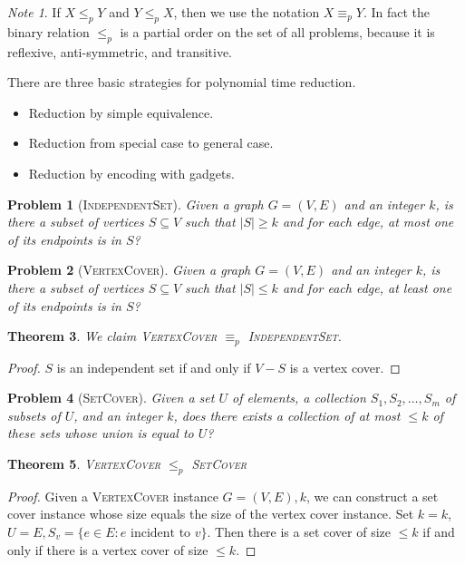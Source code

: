 \documentclass[10pt, oneside, reqno]{amsart}
\theoremstyle{plain}%
\newtheorem{thm}{Theorem}[section]
\newtheorem{prob}[thm]{Problem}
\theoremstyle{definition}
\theoremstyle{remark}
\newtheorem*{note}{Note}
\begin{document}
\begin{note}
    If $X \leq_p Y$ and $Y \leq_p X$, then we use the notation $X \equiv_p Y$.  In fact the binary relation $\leq_p$ is a partial order on the set of all problems, because it is reflexive, anti-symmetric, and transitive.
\end{note}

There are three basic strategies for polynomial time reduction.

\begin{itemize}
    \item Reduction by simple equivalence.
    \item Reduction from special case to general case.
    \item Reduction by encoding with gadgets.
\end{itemize}

\begin{prob}[\textsc{IndependentSet}]
    Given a graph $G = (V,E)$ and an integer $k$, is there a subset of vertices $S \subseteq V$ such that $|S| \geq k$ and for each edge, at most one of its endpoints is in $S$?
\end{prob}

\begin{prob}[\textsc{VertexCover}]
    Given a graph $G = (V,E)$ and an integer $k$, is there a subset of vertices $S \subseteq V$ such that $|S| \leq k$ and for each edge, at least one of its endpoints is in $S$?
\end{prob}

\begin{thm}
    We claim \textsc{VertexCover} $\equiv_p$ \textsc{IndependentSet}. 
\end{thm}

\begin{proof}
    $S$ is an independent set if and only if $V - S$ is a vertex cover.
\end{proof}

\begin{prob}[\textsc{SetCover}]
    Given a set $U$ of elements, a collection $S_1, S_2,\dots, S_m$ of subsets of $U$, and an integer $k$, does there exists a collection of at most $\leq k$ of these sets whose union is equal to $U$?
\end{prob}

\begin{thm}
    \textsc{VertexCover} $\leq_p$ \textsc{SetCover}
\end{thm}
\begin{proof}
    Given a \textsc{VertexCover} instance $G = (V,E), k$, we can construct a set cover instance whose size equals the size of the vertex cover instance. Set $k = k$, $U = E, S_v = \{e \in E : e \text{ incident to } v\}$.
    Then there is a set cover of size $\leq k$ if and only if there is a vertex cover of size $\leq k$.
\end{proof}
\end{document}

